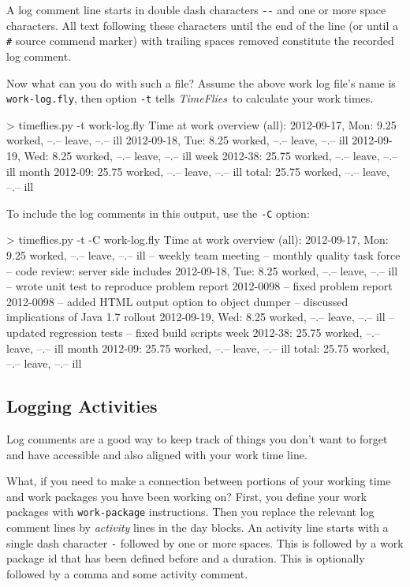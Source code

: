 \documentclass[11pt]{article}
\newcommand{\timeflies}{\emph{TimeFlies}}
\begin{document}
A log comment line starts in double dash characters \verb=--= and one or more space characters. All text following these characters until the end of the line (or until a \verb-#- source commend marker) with trailing spaces removed constitute the recorded log comment.

Now what can you do with such a file? Assume the above work log file's name is \verb:work-log.fly:, then option \verb:-t: tells \timeflies\ to calculate your work times.

\begin{inputfile}
> timeflies.py -t work-log.fly 
Time at work overview (all):
2012-09-17, Mon:  9.25 worked, --.-- leave, --.-- ill
2012-09-18, Tue:  8.25 worked, --.-- leave, --.-- ill
2012-09-19, Wed:  8.25 worked, --.-- leave, --.-- ill
   week 2012-38: 25.75 worked, --.-- leave, --.-- ill
  month 2012-09: 25.75 worked, --.-- leave, --.-- ill
          total: 25.75 worked, --.-- leave, --.-- ill
\end{inputfile}

To include the log comments in this output, use the \verb=-C= option:

\begin{inputfile}
> timeflies.py -t -C work-log.fly 
Time at work overview (all):
2012-09-17, Mon:  9.25 worked, --.-- leave, --.-- ill
             -- weekly team meeting
             -- monthly quality task force
             -- code review: server side includes
2012-09-18, Tue:  8.25 worked, --.-- leave, --.-- ill
             -- wrote unit test to reproduce problem report 2012-0098
             -- fixed problem report 2012-0098
             -- added HTML output option to object dumper
             -- discussed implications of Java 1.7 rollout
2012-09-19, Wed:  8.25 worked, --.-- leave, --.-- ill
             -- updated regression tests
             -- fixed build scripts
   week 2012-38: 25.75 worked, --.-- leave, --.-- ill
  month 2012-09: 25.75 worked, --.-- leave, --.-- ill
          total: 25.75 worked, --.-- leave, --.-- ill
\end{inputfile}

\subsection{Logging Activities}

Log comments are a good way to keep track of things you don't want to forget and have accessible and also aligned with your work time line.

What, if you need to make a connection between portions of your working time and work packages you have been working on? First, you define your work packages with \verb:work-package: instructions. Then you replace the relevant log comment lines by \emph{activity} lines in the day blocks. An activity line starts with a single dash character \verb:-: followed by one or more spaces. This is followed by a work package id that has been defined before and a duration. This is optionally followed by a comma and some activity comment.
\end{document}
